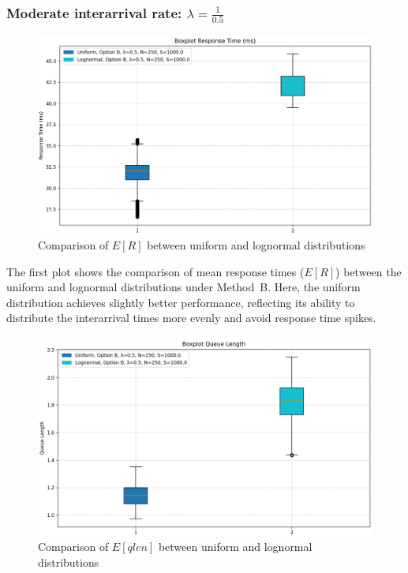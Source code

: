 \documentclass{report}
\begin{document}
\subsubsection*{Moderate interarrival rate: $\lambda = \frac{1}{0.5}$}
\begin{figure}[H]
    \centering
    \includegraphics[width=\textwidth]{img/plots/I-vary/R_B_I05.png}
    \caption{Comparison of $E[R]$ between uniform and lognormal distributions}
\end{figure}

\begin{flushleft}
The first plot shows the comparison of mean response times ($E[R]$) between the uniform and lognormal distributions under Method~B. Here, the uniform distribution achieves slightly better performance, reflecting its ability to distribute the interarrival times more evenly and avoid response time spikes.
\end{flushleft}

\begin{figure}[H]
    \centering
    \includegraphics[width=\textwidth]{img/plots/I-vary/Q_B_I05.png}
    \caption{Comparison of $E[qlen]$ between uniform and lognormal distributions}
\end{figure}
\end{document}
